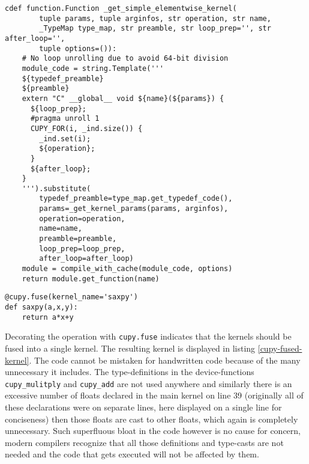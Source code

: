 \documentclass[english,11pt,a4paper,table]{article} %
\begin{document}
\begin{verbatim}
cdef function.Function _get_simple_elementwise_kernel(
        tuple params, tuple arginfos, str operation, str name,
        _TypeMap type_map, str preamble, str loop_prep='', str after_loop='',
        tuple options=()):
    # No loop unrolling due to avoid 64-bit division
    module_code = string.Template('''
    ${typedef_preamble}
    ${preamble}
    extern "C" __global__ void ${name}(${params}) {
      ${loop_prep};
      #pragma unroll 1
      CUPY_FOR(i, _ind.size()) {
        _ind.set(i);
        ${operation};
      }
      ${after_loop};
    }
    ''').substitute(
        typedef_preamble=type_map.get_typedef_code(),
        params=_get_kernel_params(params, arginfos),
        operation=operation,
        name=name,
        preamble=preamble,
        loop_prep=loop_prep,
        after_loop=after_loop)
    module = compile_with_cache(module_code, options)
    return module.get_function(name)
\end{verbatim}

\begin{verbatim}
@cupy.fuse(kernel_name='saxpy')
def saxpy(a,x,y):
    return a*x+y
\end{verbatim}

Decorating the operation with \texttt{cupy.fuse} indicates that the kernels should be fused into a single kernel.
The resulting kernel is displayed in listing \ref{cupy-fused-kernel}.
The code cannot be mistaken for handwritten code because of the many unnecessary it includes.
The type-definitions in the device-functions \texttt{cupy\_mulitply} and \texttt{cupy\_add} are not used anywhere and similarly there is an excessive number of floats declared in the main kernel on line 39 (originally all of these declarations were on separate lines, here displayed on a single line for conciseness) then those floats are cast to other floats, which again is completely unnecessary.
Such superfluous bloat in the code however is no cause for concern, modern compilers recognize that all those definitions and type-casts are not needed and the code that gets executed will not be affected by them.
\end{document}

